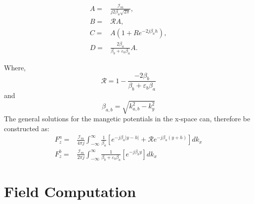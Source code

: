 \documentclass{article}
\begin{document}
  \begin{subequations}
    \begin{align}
      A ={}& \frac{\mathcal{I}_m}{j2\beta_a \sqrt{2\pi}}, \\
      B ={}& \mathcal{R} A, \\
      C ={}& A \left( 1 + Re^{-2j\beta_a h} \right), \\
      D ={}& \frac{2\beta_a}{\beta_b + \varepsilon_b \beta_a} A.
    \end{align}
  \end{subequations}

  Where,
  \begin{equation}
    \mathcal{R} = 1 - \frac{-2\beta_b}{\beta_b + \varepsilon_b \beta_a}
  \end{equation}
  and
  \begin{equation}
    \beta_{a,b} = \sqrt{k_{a,b}^2 - k_y^2}
  \end{equation}
The general solutions for the mangetic potentials in the x-space can, therefore be constructed as:
\begin{subequations}
  \begin{align}
    F_z^a ={}& \frac{\mathcal{I}_m}{4 \pi j}\int_{-\infty}^{\infty} \frac{1}{\beta_a} \left[ e^{-j \beta_a |y - h|} + \mathcal{R} e^{-j \beta_a (y + h)} \right] dk_x \\
    F_z^b ={}& \frac{\mathcal{I}_m}{2 \pi j}\int_{-\infty}^{\infty} \frac{1}{\beta_b + \varepsilon_b \beta_a} \left[e^{-j \beta_b y} \right] dk_x
  \end{align}
\end{subequations}

\section{Field Computation}
\end{document}
